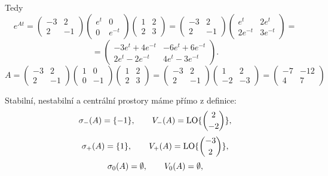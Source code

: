 \documentclass[12pt]{article}					%
\begin{document}
\begin{priklad}
\begin{reseni}
		Tedy
		$$ e^{At} = \begin{pmatrix} -3 & 2 \\ 2 & -1 \end{pmatrix} \begin{pmatrix} e^t & 0 \\ 0 & e^{-t} \end{pmatrix} \begin{pmatrix} 1 & 2 \\ 2 & 3 \end{pmatrix} = \begin{pmatrix} -3 & 2 \\ 2 & -1 \end{pmatrix} \begin{pmatrix} e^t & 2e^t \\ 2e^{-t} & 3e^{-t} \end{pmatrix} = $$
		$$ = \begin{pmatrix} -3e^t + 4e^{-t} & -6e^t + 6e^{-t} \\ 2e^t - 2e^{-t} & 4e^t - 3e^{-t} \end{pmatrix}. $$
		$$ A = \begin{pmatrix} -3 & 2 \\ 2 & -1 \end{pmatrix} \begin{pmatrix} 1 & 0 \\ 0 & -1 \end{pmatrix} \begin{pmatrix} 1 & 2 \\ 2 & 3 \end{pmatrix} = \begin{pmatrix} -3 & 2 \\ 2 & -1 \end{pmatrix} \begin{pmatrix} 1 & 2 \\ -2 & -3 \end{pmatrix} = \begin{pmatrix} -7 & -12 \\ 4 & 7 \end{pmatrix}  $$

		Stabilní, nestabilní a centrální prostory máme přímo z definice:
		$$ \sigma_-(A) = \{-1\}, \qquad V_-(A) = \operatorname{LO} \{\binom{2}{-2}\}, $$
		$$ \sigma_+(A) = \{1\}, \qquad V_+(A) = \operatorname{LO} \{\binom{-3}{2}\}, $$
		$$ \sigma_0(A) = \emptyset, \qquad V_0(A) = \emptyset, $$
	\end{reseni}
\end{priklad}
\end{document}
